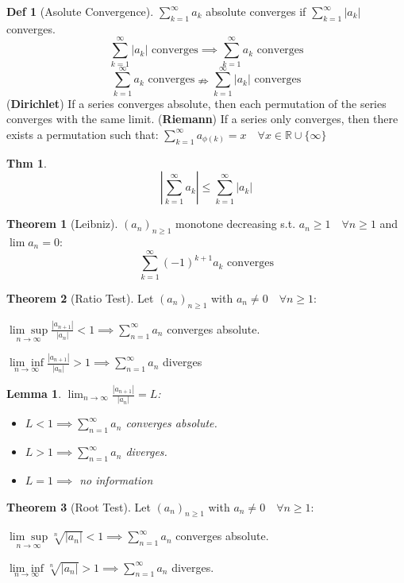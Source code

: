 \documentclass[a4paper, 10pt]{article}
\newtheorem*{lemma}{Lemma}
\theoremstyle{definition}
\newtheorem*{theorem}{Thm}
\newtheorem*{definition}{Def}
\theoremstyle{named}
\newtheorem*{ntheorem_wrapper}{Theorem}
\newenvironment{ntheorem}%
    {\begin{mdframed}[style=important]\begin{ntheorem_wrapper}}%
    {\end{ntheorem_wrapper}\end{mdframed}}
\newcommand{\R}{\mathbb{R}}
\begin{document}
\begin{definition}[Asolute Convergence]
    $\sum_{k=1}^\infty a_k$ absolute converges if $\sum_{k=1}^\infty |a_k|$ converges.
    $$\sum_{k = 1}^\infty |a_k| \text{ converges} \implies \sum_{k=1}^\infty a_k \text{ converges}$$
    $$\sum_{k=1}^\infty a_k \text{ converges} \nRightarrow \sum_{k=1}^\infty |a_k| \text{ converges}$$
    (\textbf{Dirichlet}) If a series converges absolute, then each permutation of the series converges with the same limit.
    (\textbf{Riemann}) If a series only converges, then there exists a permutation such that: \newline $\sum_{k=1}^\infty a_{\phi(k)} = x \quad \forall x \in \R \cup \{\infty\}$
\end{definition}

\begin{theorem}
    $$|\sum_{k=1}^\infty a_k| \leq \sum_{k=1}^\infty |a_k|$$
\end{theorem}

\begin{ntheorem}[Leibniz]
    $(a_n)_{n\geq1}$ monotone decreasing s.t. $a_n \geq 1 \quad \forall n \geq 1$ and $\lim a_n = 0$:
    $$\sum_{k=1}^\infty (-1)^{k + 1} a_k \text{ converges}$$
\end{ntheorem}

\begin{ntheorem}[Ratio Test]
    Let $(a_n)_{n \geq 1}$ with $a_n \neq 0 \quad \forall n\geq 1$:
    
    $\underset{n\to\infty}{\lim\sup} \frac{|a_{n+1}|}{|a_n|} < 1 \implies \sum_{n=1}^\infty a_n$ converges absolute.

    $\underset{n\to\infty}{\lim\inf} \frac{|a_{n+1}|}{|a_n|} > 1 \implies \sum_{n=1}^\infty a_n$ diverges
\end{ntheorem}

\begin{lemma}
    $\lim_{n\to\infty} \frac{|a_{n+1}|}{|a_n|} = L$:

    \begin{itemize}
        \item $L < 1 \implies \sum_{n=1}^\infty a_n$ converges absolute.
        \item $L > 1 \implies \sum_{n=1}^\infty a_n$ diverges.
        \item $L = 1 \implies$ no information
    \end{itemize}
\end{lemma}

\begin{ntheorem}[Root Test]
    Let $(a_n)_{n \geq 1}$ with $a_n \neq 0 \quad \forall n\geq 1$:

    $\underset{n\to\infty}{\lim\sup} \sqrt[n]{|a_n|} < 1 \implies \sum_{n=1}^\infty a_n$ converges absolute.

    $\underset{n\to\infty}{\lim\inf} \sqrt[n]{|a_n|} > 1 \implies \sum_{n=1}^\infty a_n$ diverges.
\end{ntheorem}
\end{document}
